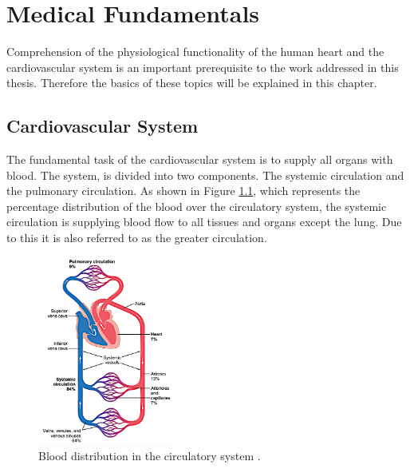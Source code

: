 \chapter{Medical Fundamentals}
Comprehension of the physiological functionality of the human heart and the cardiovascular system is an important prerequisite to the work addressed in this thesis. Therefore the basics of these topics will be explained in this chapter.

\section{Cardiovascular System}
The fundamental task of the cardiovascular system is to supply all organs with blood. The system, is divided into two components. The systemic circulation and the pulmonary circulation. As shown in Figure \ref{fig:circulation}, which represents the percentage distribution of the blood over the circulatory system, the systemic circulation is supplying blood flow to all tissues and organs except the lung. Due to this it is also referred to as the greater circulation. \cite{GH20}
\begin{figure}[h]
  \centering
  \includegraphics[width=0.4\textwidth, height=0.6\textwidth]{images/circulation.jpg}
  \caption{Blood distribution in the circulatory system \cite{GH20}.}
  \label{fig:circulation}
\end{figure}
